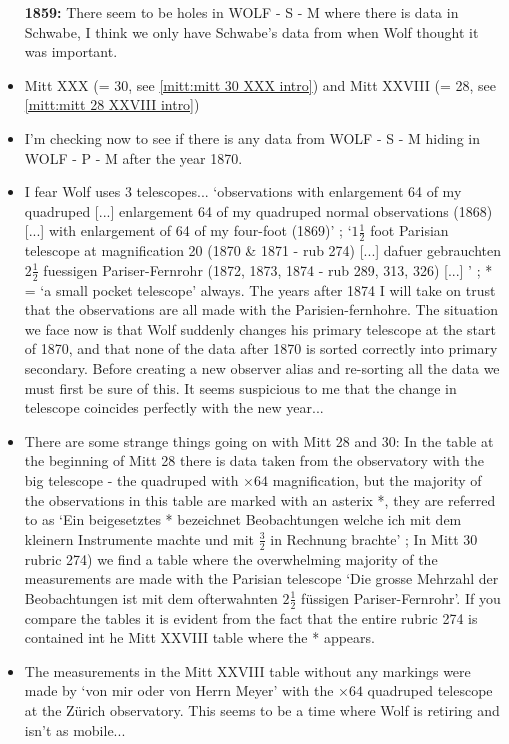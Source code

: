 \documentclass[12pt]{article}
\begin{document}
\begin{itemize}
 \item[\textbf{1859:}] There seem to be holes in WOLF - S - M where there is data in Schwabe, I think we only have Schwabe's data from when Wolf thought it was important.
    \item Mitt XXX (= 30, see \ref{mitt:mitt 30 XXX intro}) and Mitt XXVIII (= 28, see \ref{mitt:mitt 28 XXVIII intro})
    \item I'm checking now to see if there is any data from WOLF - S - M hiding in WOLF - P - M after the year 1870.
    \item I fear Wolf uses 3 telescopes... `observations with enlargement 64 of my quadruped [...] enlargement 64 of my quadruped normal observations (1868) [...] with enlargement of 64 of my four-foot (1869)' ; `$1 \frac{1}{2}$ foot Parisian telescope at magnification 20 (1870 & 1871 - rub 274) [...] dafuer gebrauchten $2\frac{1}{2}$ fuessigen Pariser-Fernrohr (1872, 1873, 1874 - rub 289, 313, 326) [...] ' ; * = `a small pocket telescope' always. The years after 1874 I will take on trust that the observations are all made with the Parisien-fernhohre. The situation we face now is that Wolf suddenly changes his primary telescope at the start of 1870, and that none of the data after 1870 is sorted correctly into primary secondary. Before creating a new observer alias and re-sorting all the data we must first be sure of this. It seems suspicious to me that the change in telescope coincides perfectly with the new year...
    \item There are some strange things going on with Mitt 28 and 30: In the table at the beginning of Mitt 28 there is data taken from the observatory with the big telescope - the quadruped with $\times 64$ magnification, but the majority of the observations in this table are marked with an asterix *, they are referred to as `Ein beigesetztes * bezeichnet Beobachtungen welche ich mit dem kleinern Instrumente machte und mit $\frac{3}{2}$ in Rechnung brachte' ; In Mitt 30 rubric 274) we find a table where the overwhelming majority of the measurements are made with the Parisian telescope `Die grosse Mehrzahl der Beobachtungen ist mit dem ofterwahnten $2\frac{1}{2}$ füssigen Pariser-Fernrohr'. If you compare the tables it is evident from the fact that the entire rubric 274 is contained int he Mitt XXVIII table where the * appears. 
    \item The measurements in the Mitt XXVIII table without any markings were made by `von mir oder von Herrn Meyer' with the $\times 64$ quadruped telescope at the Zürich observatory. This seems to be a time where Wolf is retiring and isn't as mobile...

\end{itemize}
\end{document}
